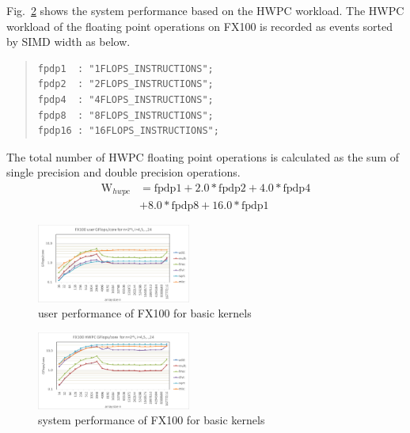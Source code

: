 \documentclass[conference]{IEEEtran}
\begin{document}
Fig.~\ref{fig:fx100-gflops-system-long-R8} shows the 
system performance based on the HWPC workload.
The HWPC workload of the floating point operations on FX100 is
recorded as events sorted by SIMD width as below.
\begin{quote}
\begin{small}
\begin{verbatim}
fpdp1  : "1FLOPS_INSTRUCTIONS";
fpdp2  : "2FLOPS_INSTRUCTIONS";
fpdp4  : "4FLOPS_INSTRUCTIONS";
fpdp8  : "8FLOPS_INSTRUCTIONS";
fpdp16 : "16FLOPS_INSTRUCTIONS";
\end{verbatim}
\end{small}
\end{quote}
The total number of HWPC floating point operations
is calculated as the sum of single precision and double precision operations.
\begin{align}
	\mathrm{W}_{hwpc} & = \mathrm{fpdp1} + 2.0*\mathrm{fpdp2} + 4.0*\mathrm{fpdp4} \nonumber \\
			& + 8.0*\mathrm{fpdp8} + 16.0*\mathrm{fpdp1} 
\end{align}

\begin{figure}[tb]
\centering
\includegraphics[width=0.45\textwidth]{figs/fx100-gflops-user-long-R8.pdf}
\caption{user performance of FX100 for basic kernels}
\label{fig:fx100-gflops-user-long-R8}
\end{figure}

\begin{figure}[tb]
\centering
\includegraphics[width=0.45\textwidth]{figs/fx100-gflops-system-long-R8.pdf}
\caption{system performance of FX100 for basic kernels}
\label{fig:fx100-gflops-system-long-R8}
\end{figure}
\end{document}
